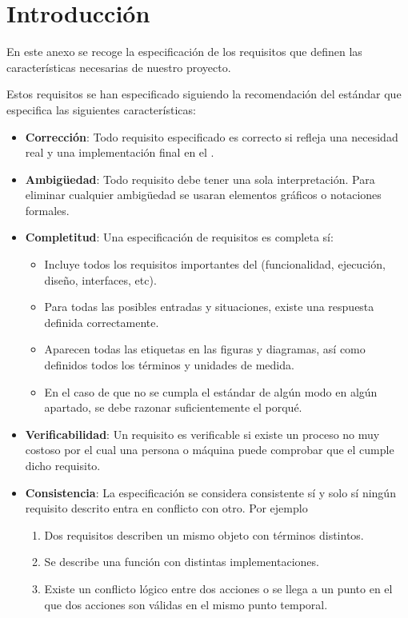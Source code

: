 
\section{Introducción}

En este anexo se recoge la especificación de los requisitos que definen las características necesarias de nuestro proyecto.

Estos requisitos se han especificado siguiendo la recomendación del estándar   que especifica las siguientes características:

\begin{itemize}
  \item \textbf{Corrección}: Todo requisito especificado es correcto si refleja una necesidad real y una implementación final en el .

  \item \textbf{Ambigüedad}: Todo requisito debe tener una sola interpretación. Para eliminar cualquier ambigüedad se usaran elementos gráficos o notaciones formales.

  \item \textbf{Completitud}: Una especificación de requisitos es completa sí:
        \begin{itemize}
          \item Incluye todos los requisitos importantes del  (funcionalidad, ejecución, diseño, interfaces, etc).
          \item Para todas las posibles entradas y situaciones, existe una respuesta definida correctamente.
          \item Aparecen todas las etiquetas en las figuras y diagramas, así como definidos todos los términos y unidades de medida.
          \item En el caso de que no se cumpla el estándar de algún modo en algún apartado, se debe razonar suficientemente el porqué.
        \end{itemize}

  \item \textbf{Verificabilidad}: Un requisito es verificable si existe un proceso no muy costoso por el cual una persona o máquina puede comprobar que el  cumple dicho requisito.

  \item \textbf{Consistencia}: La especificación se considera consistente sí y solo sí ningún requisito descrito entra en conflicto con otro. Por ejemplo
        \begin{enumerate}
          \item Dos requisitos describen un mismo objeto con términos distintos.
          \item Se describe una función con distintas implementaciones.
          \item Existe un conflicto lógico entre dos acciones o se llega a un punto en el que dos acciones son válidas en el mismo punto temporal.
        \end{enumerate}


\end{itemize}
